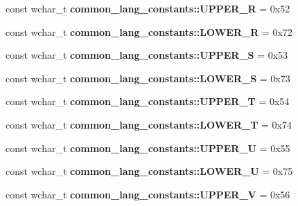 \begin{DoxyCompactItemize}
\item 
\hypertarget{group___indexing_ga07779090d09229acc2d7e8e3757f29c4}{const wchar\-\_\-t {\bfseries common\-\_\-lang\-\_\-constants\-::\-U\-P\-P\-E\-R\-\_\-\-R} = 0x52}\label{group___indexing_ga07779090d09229acc2d7e8e3757f29c4}

\item 
\hypertarget{group___indexing_ga2c4319ba87611685d76d33aa2c1a337e}{const wchar\-\_\-t {\bfseries common\-\_\-lang\-\_\-constants\-::\-L\-O\-W\-E\-R\-\_\-\-R} = 0x72}\label{group___indexing_ga2c4319ba87611685d76d33aa2c1a337e}

\item 
\hypertarget{group___indexing_ga891320fedd51d532ca01e88a9e15df0f}{const wchar\-\_\-t {\bfseries common\-\_\-lang\-\_\-constants\-::\-U\-P\-P\-E\-R\-\_\-\-S} = 0x53}\label{group___indexing_ga891320fedd51d532ca01e88a9e15df0f}

\item 
\hypertarget{group___indexing_ga50705b127543e630850bfa151577cde9}{const wchar\-\_\-t {\bfseries common\-\_\-lang\-\_\-constants\-::\-L\-O\-W\-E\-R\-\_\-\-S} = 0x73}\label{group___indexing_ga50705b127543e630850bfa151577cde9}

\item 
\hypertarget{group___indexing_gae138ddacce56ab66e2cdd7d1f155e6fa}{const wchar\-\_\-t {\bfseries common\-\_\-lang\-\_\-constants\-::\-U\-P\-P\-E\-R\-\_\-\-T} = 0x54}\label{group___indexing_gae138ddacce56ab66e2cdd7d1f155e6fa}

\item 
\hypertarget{group___indexing_ga5af05103127898386d88e5ee9702f78f}{const wchar\-\_\-t {\bfseries common\-\_\-lang\-\_\-constants\-::\-L\-O\-W\-E\-R\-\_\-\-T} = 0x74}\label{group___indexing_ga5af05103127898386d88e5ee9702f78f}

\item 
\hypertarget{group___indexing_ga3e4add5c1d68a75645d2137c57bffba8}{const wchar\-\_\-t {\bfseries common\-\_\-lang\-\_\-constants\-::\-U\-P\-P\-E\-R\-\_\-\-U} = 0x55}\label{group___indexing_ga3e4add5c1d68a75645d2137c57bffba8}

\item 
\hypertarget{group___indexing_gac39389c8416a4063038712e08f4c88f4}{const wchar\-\_\-t {\bfseries common\-\_\-lang\-\_\-constants\-::\-L\-O\-W\-E\-R\-\_\-\-U} = 0x75}\label{group___indexing_gac39389c8416a4063038712e08f4c88f4}

\item 
\hypertarget{group___indexing_gadaa8465e225365d9664348ea32e5c3b0}{const wchar\-\_\-t {\bfseries common\-\_\-lang\-\_\-constants\-::\-U\-P\-P\-E\-R\-\_\-\-V} = 0x56}\label{group___indexing_gadaa8465e225365d9664348ea32e5c3b0}


\end{DoxyCompactItemize}

